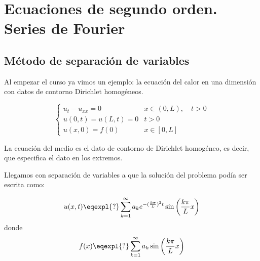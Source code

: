 
\chapter{Ecuaciones de segundo orden. Series de Fourier}
\label{chap:EcuacionesSegundoOrden}

\section{Método de separación de variables}

	Al empezar el curso ya vimos un ejemplo: la ecuación del calor en una dimensión con datos de contorno Dirichlet homogéneos.

	\begin{example} 
		\[
		\begin{cases}
		u_t - u_{xx} = 0 & x \in (0,L), \quad t > 0 \\
		u(0,t) = u(L,t) = 0 & t > 0 \\
		u(x,0) = f(0) & x \in [0,L]
		\end{cases}
		\]

		La ecuación del medio es el dato de contorno de Dirichlet homogéneo, es decir, que especifica el dato en los extremos.

		Llegamos con separación de variables a que la solución del problema podía ser escrita como:

		\[ u(x,t) \eqexpl{?} \sum^{\infty}_{k=1} a_k e^{-(\frac{k\pi}{L})^2 t} \sin \left( \frac{k\pi}{L} x \right) \]
		donde
		\[ f(x) \eqexpl{?} \sum^{\infty}_{k=1} a_k \sin \left( \frac{k\pi}{L}x \right) \]
	\end{example}


